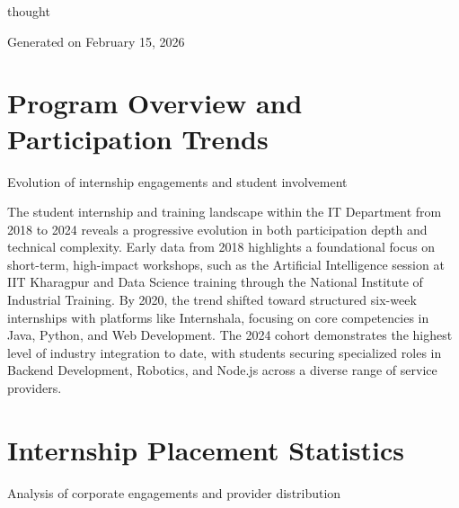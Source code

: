 thought\documentclass[11pt,a4paper]{article}
\begin{document}
\vfill
\textcolor{muted}{\small Generated on February 15, 2026}
\clearpage

\section*{Program Overview and Participation Trends}
{\large\textcolor{muted}{Evolution of internship engagements and student involvement}}

\vspace{0.5cm}

\begin{card}
The student internship and training landscape within the IT Department from 2018 to 2024 reveals a progressive evolution in both participation depth and technical complexity. Early data from 2018 highlights a foundational focus on short-term, high-impact workshops, such as the Artificial Intelligence session at IIT Kharagpur and Data Science training through the National Institute of Industrial Training. By 2020, the trend shifted toward structured six-week internships with platforms like Internshala, focusing on core competencies in Java, Python, and Web Development. The 2024 cohort demonstrates the highest level of industry integration to date, with students securing specialized roles in Backend Development, Robotics, and Node.js across a diverse range of service providers.

\vspace{0.5cm}

\begin{center}
\end{center}
\end{card}

\clearpage

\section*{Internship Placement Statistics}
{\large\textcolor{muted}{Analysis of corporate engagements and provider distribution}}
\end{document}

